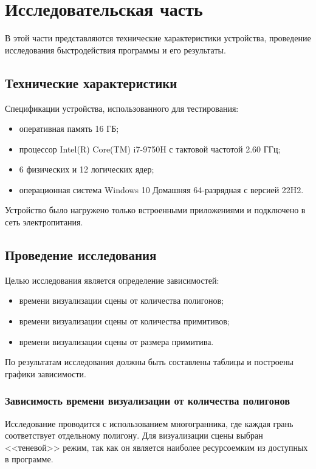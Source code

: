 \chapter{Исследовательская часть}

В этой части представляются технические характеристики устройства,
проведение исследования быстродействия программы и его результаты.

\section{Технические характеристики}

Спецификации устройства, использованного для тестирования:
\begin{itemize}[label=--]
	\item оперативная память 16 ГБ;
	\item процессор Intel(R) Core(TM) i7-9750H с тактовой частотой 2.60 ГГц;
	\item 6 физических и 12 логических ядер;
	\item операционная система Windows 10 Домашняя 64-разрядная с версией 22H2.
\end{itemize}

Устройство было нагружено только встроенными приложениями и подключено в сеть электропитания. 

\section{Проведение исследования}

Целью исследования является определение зависимостей: 
\begin{itemize}[label=--]
	\item времени визуализации сцены от количества полигонов;
	\item времени визуализации сцены от количества примитивов;
	\item времени визуализации сцены от размера примитива.
\end{itemize}

По результатам исследования должны быть составлены таблицы и построены графики зависимости.

\subsection{Зависимость времени визуализации от количества полигонов}

Исследование проводится с использованием многогранника, где каждая грань соответствует отдельному полигону. Для визуализации сцены выбран <<теневой>> режим, так как он является наиболее ресурсоемким из доступных в программе.

